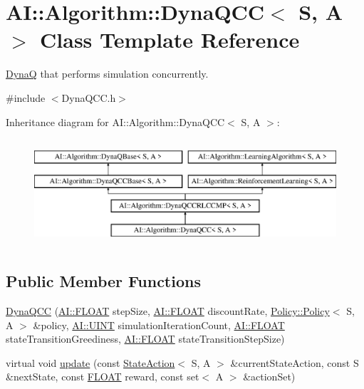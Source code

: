 \hypertarget{classAI_1_1Algorithm_1_1DynaQCC}{\section{A\+I\+:\+:Algorithm\+:\+:Dyna\+Q\+C\+C$<$ S, A $>$ Class Template Reference}
\label{classAI_1_1Algorithm_1_1DynaQCC}
}


\hyperlink{classAI_1_1Algorithm_1_1DynaQ}{Dyna\+Q} that performs simulation concurrently.  




{\ttfamily \#include $<$Dyna\+Q\+C\+C.\+h$>$}

Inheritance diagram for A\+I\+:\+:Algorithm\+:\+:Dyna\+Q\+C\+C$<$ S, A $>$\+:\begin{figure}[H]
\begin{center}
\leavevmode
\includegraphics[height=4.000000cm]{classAI_1_1Algorithm_1_1DynaQCC}
\end{center}
\end{figure}
\subsection*{Public Member Functions}
\begin{DoxyCompactItemize}
\item 
\hyperlink{classAI_1_1Algorithm_1_1DynaQCC_aab347f88243e3690cbc856347ed37378}{Dyna\+Q\+C\+C} (\hyperlink{namespaceAI_a41b74884a20833db653dded3918e05c3}{A\+I\+::\+F\+L\+O\+A\+T} step\+Size, \hyperlink{namespaceAI_a41b74884a20833db653dded3918e05c3}{A\+I\+::\+F\+L\+O\+A\+T} discount\+Rate, \hyperlink{classAI_1_1Algorithm_1_1Policy_1_1Policy}{Policy\+::\+Policy}$<$ S, A $>$ \&policy, \hyperlink{namespaceAI_ab6e14dc1e659854858a87e511f1439ec}{A\+I\+::\+U\+I\+N\+T} simulation\+Iteration\+Count, \hyperlink{namespaceAI_a41b74884a20833db653dded3918e05c3}{A\+I\+::\+F\+L\+O\+A\+T} state\+Transition\+Greediness, \hyperlink{namespaceAI_a41b74884a20833db653dded3918e05c3}{A\+I\+::\+F\+L\+O\+A\+T} state\+Transition\+Step\+Size)
\item 
virtual void \hyperlink{classAI_1_1Algorithm_1_1DynaQCC_ae23b8f0afbb9fc5024aef9ce720c9b84}{update} (const \hyperlink{classAI_1_1StateAction}{State\+Action}$<$ S, A $>$ \&current\+State\+Action, const S \&next\+State, const \hyperlink{namespaceAI_a41b74884a20833db653dded3918e05c3}{F\+L\+O\+A\+T} reward, const set$<$ A $>$ \&action\+Set)
\end{DoxyCompactItemize}
